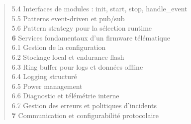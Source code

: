 \begin{quote}
\hspace{2.5em} 5.4 \hspace{0.5em} Interfaces de modules : init, start, stop, handle\_event \dotfill \pageref{subsec:interfaces}\\
\hspace{2.5em} 5.5 \hspace{0.5em} Patterns event-driven et pub/sub \dotfill \pageref{subsec:eventdriven}\\
\hspace{2.5em} 5.6 \hspace{0.5em} Pattern strategy pour la sélection runtime \dotfill \pageref{subsec:strategy}\\
\textbf{6} \hspace{1em} Services fondamentaux d'un firmware télématique \dotfill \pageref{sec:services}\\
\hspace{2.5em} 6.1 \hspace{0.5em} Gestion de la configuration \dotfill \pageref{subsec:config}\\
\hspace{2.5em} 6.2 \hspace{0.5em} Stockage local et endurance flash \dotfill \pageref{subsec:stockage}\\
\hspace{2.5em} 6.3 \hspace{0.5em} Ring buffer pour logs et données offline \dotfill \pageref{subsec:ringbuffer}\\
\hspace{2.5em} 6.4 \hspace{0.5em} Logging structuré \dotfill \pageref{subsec:logging}\\
\hspace{2.5em} 6.5 \hspace{0.5em} Power management \dotfill \pageref{subsec:power}\\
\hspace{2.5em} 6.6 \hspace{0.5em} Diagnostic et télémétrie interne \dotfill \pageref{subsec:diag}\\
\hspace{2.5em} 6.7 \hspace{0.5em} Gestion des erreurs et politiques d'incidents \dotfill \pageref{subsec:erreurs}\\
\textbf{7} \hspace{1em} Communication et configurabilité protocolaire \dotfill \pageref{sec:comms}\\

\end{quote}
